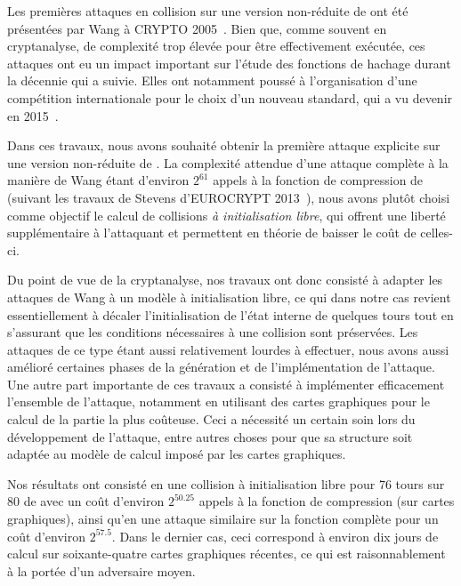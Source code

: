 \medskip

Les premières attaques en collision sur une version non-réduite de \shaone ont été présentées par Wang \etal à CRYPTO 2005~\cite{DBLP:conf/crypto/WangYY05a}. Bien que,
comme souvent en cryptanalyse, de complexité
trop élevée pour être effectivement exécutée, ces attaques ont eu un impact important sur l'étude des fonctions de hachage durant la décennie qui a suivie. Elles ont notamment poussé à l'organisation
d'une compétition internationale pour le choix d'un nouveau standard, qui a vu \keccak devenir \shathree en 2015~\cite{Nist-SHA3}.

Dans ces travaux, nous avons souhaité obtenir la première attaque explicite sur une version non-réduite de \shaone. La complexité attendue d'une attaque complète à la
manière de Wang étant d'environ $2^{61}$ appels
à la fonction de compression de \shaone (suivant les travaux de Stevens d'EUROCRYPT 2013~\cite{DBLP:conf/eurocrypt/Stevens13}), nous avons plutôt choisi comme objectif le calcul de collisions
\emph{à initialisation libre}, qui offrent une liberté supplémentaire à l'attaquant et permettent en théorie de baisser le coût de celles-ci.

Du point de vue de la cryptanalyse, nos travaux ont
donc consisté à adapter les attaques de Wang \etal à un modèle à initialisation libre, ce qui dans notre cas revient essentiellement à décaler l'initialisation de l'état interne \shaone de quelques
tours tout en s'assurant que les conditions nécessaires à une collision sont préservées. Les attaques de ce type étant aussi relativement lourdes à effectuer, nous avons aussi amélioré certaines
phases de la génération et de l'implémentation de l'attaque.
Une autre part importante de ces travaux a consisté à implémenter efficacement l'ensemble de l'attaque, notamment en utilisant des cartes graphiques pour le calcul de la partie la plus coûteuse.
Ceci a nécessité un certain soin lors du développement de l'attaque, entre autres choses pour que sa structure soit adaptée au modèle de calcul imposé par les cartes graphiques.

Nos résultats ont consisté en une collision à initialisation libre pour 76 tours sur 80 de \shaone avec un coût d'environ $2^{50.25}$ appels à la fonction de compression (sur cartes graphiques),
ainsi qu'en une attaque similaire sur la fonction complète pour un coût d'environ $2^{57.5}$. Dans le dernier cas, ceci correspond à environ dix jours de calcul sur soixante-quatre cartes
graphiques récentes, ce qui est raisonnablement à la portée d'un adversaire moyen.


